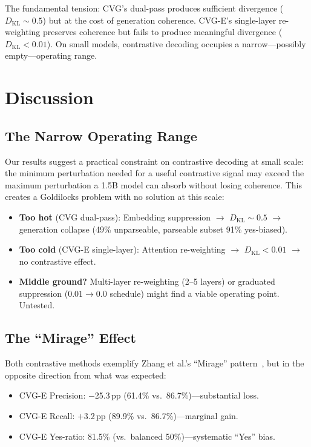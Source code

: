 \documentclass[10pt,twocolumn]{article}
\begin{document}
The fundamental tension: CVG's dual-pass produces sufficient divergence ($D_{\text{KL}} \sim 0.5$) but at the cost of generation coherence. CVG-E's single-layer re-weighting preserves coherence but fails to produce meaningful divergence ($D_{\text{KL}} < 0.01$). On small models, contrastive decoding occupies a narrow---possibly empty---operating range.

\section{Discussion}

\subsection{The Narrow Operating Range}

Our results suggest a practical constraint on contrastive decoding at small scale: the minimum perturbation needed for a useful contrastive signal may exceed the maximum perturbation a 1.5B model can absorb without losing coherence. This creates a Goldilocks problem with no solution at this scale:

\begin{itemize}
\item \textbf{Too hot} (CVG dual-pass): Embedding suppression $\to$ $D_{\text{KL}} \sim 0.5$ $\to$ generation collapse (49\% unparseable, parseable subset 91\% yes-biased).
\item \textbf{Too cold} (CVG-E single-layer): Attention re-weighting $\to$ $D_{\text{KL}} < 0.01$ $\to$ no contrastive effect.
\item \textbf{Middle ground?} Multi-layer re-weighting (2--5 layers) or graduated suppression ($0.01 \to 0.0$ schedule) might find a viable operating point. Untested.
\end{itemize}

\subsection{The ``Mirage'' Effect}
\label{sec:mirage}

Both contrastive methods exemplify Zhang et al.'s ``Mirage'' pattern~\cite{mirage2025}, but in the opposite direction from what was expected:

\begin{itemize}
\item CVG-E Precision: $-$25.3\,pp (61.4\% vs.\ 86.7\%)---substantial loss.
\item CVG-E Recall: $+$3.2\,pp (89.9\% vs.\ 86.7\%)---marginal gain.
\item CVG-E Yes-ratio: 81.5\% (vs.\ balanced 50\%)---systematic ``Yes'' bias.
\end{itemize}
\end{document}
